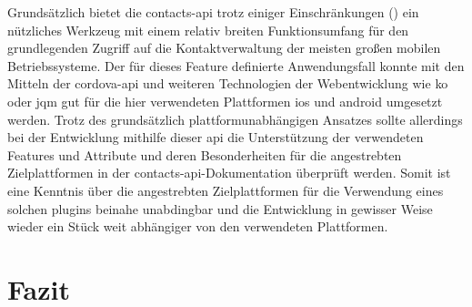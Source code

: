 Grundsätzlich bietet die \gls{contacts-api} trotz einiger Einschränkungen (\so) ein nützliches Werkzeug mit einem relativ breiten Funktionsumfang für den grundlegenden Zugriff auf die Kontaktverwaltung der meisten großen mobilen Betriebssysteme.
Der für dieses Feature definierte Anwendungsfall konnte mit den Mitteln der \gls{cordova}-\gls{api} und weiteren Technologien der Webentwicklung wie \gls{ko} oder \gls{jqm} gut für die hier verwendeten Plattformen \gls{ios} und \gls{android} umgesetzt werden.
Trotz des grundsätzlich plattformunabhängigen Ansatzes sollte allerdings bei der Entwicklung mithilfe dieser \gls{api} die Unterstützung der verwendeten Features und Attribute und deren Besonderheiten für die angestrebten Zielplattformen in der \gls{contacts-api}-Dokumentation überprüft werden.
Somit ist eine Kenntnis über die angestrebten Zielplattformen für die Verwendung eines solchen \glspl{plugin} beinahe unabdingbar und die Entwicklung in gewisser Weise wieder ein Stück weit abhängiger von den verwendeten Plattformen. %



\chapter{Fazit} %


